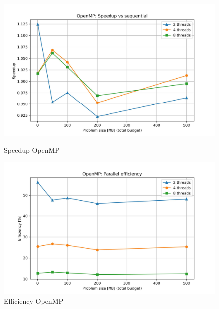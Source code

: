 			\begin{figure}[H]
				\centering
				\begin{minipage}[t]{0.49\textwidth}
					\centering
					\includegraphics[width=\textwidth]{img/omp_plots/omp_speedup.jpg}
					\caption{Speedup OpenMP}
					\label{fig:omp_speedup}
				\end{minipage}
				\hfill
				\begin{minipage}[t]{0.49\textwidth}
					\centering
					\includegraphics[width=\textwidth]{img/omp_plots/omp_efficiency.jpg}
					\caption{Efficiency OpenMP}
					\label{fig:omp_efficiency}
				\end{minipage}
			\end{figure}
			
